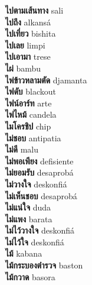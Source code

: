 \textbf{ ไปตามเส้นทาง  } sali \\
\textbf{ ไปถึง  } alkansá \\
\textbf{ ไปเที่ยว  } bishita \\
\textbf{ ไปเลย  } limpi \\
\textbf{ ไปเอามา  } trese \\
\textbf{ ไผ่  } bambu \\
\textbf{ ไพ่ข้าวหลามตัด  } djamanta \\
\textbf{ ไฟดับ  } blackout \\
\textbf{ ไฟน์อาร์ท  } arte \\
\textbf{ ไฟไหม้  } candela \\
\textbf{ ไมโครชิป  } chip \\
\textbf{ ไม่ชอบ  } antipatia \\
\textbf{ ไม่ดี  } malu \\
\textbf{ ไม่พอเพียง  } defisiente \\
\textbf{ ไม่ยอมรับ  } desaprobá \\
\textbf{ ไม่วางใจ  } deskonfiá \\
\textbf{ ไม่เห็นชอบ  } desaprobá \\
\textbf{ ไม่แน่ใจ  } duda \\
\textbf{ ไม่แพง  } barata \\
\textbf{ ไม่ไว้วางใจ  } deskonfiá \\
\textbf{ ไม่ไว้ใจ  } deskonfiá \\
\textbf{ ไม้  } kabana \\
\textbf{ ไม้กระบองตำรวจ  } baston \\
\textbf{ ไม้กวาด  } basora \\
